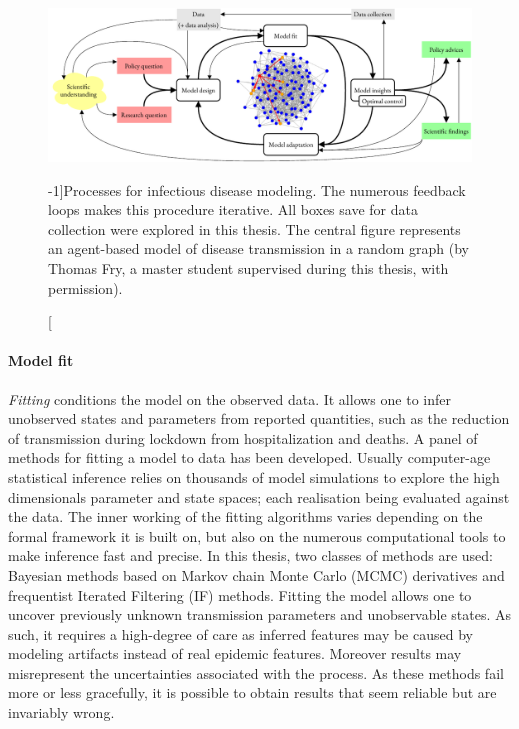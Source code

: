  \begin{figure}\centering
  \includegraphics{fig/modeling_cycle}
  \caption[Processes for infectious disease modeling][-1\baselineskip]{Processes for  infectious disease modeling. The numerous feedback loops makes this procedure iterative. All boxes save for data collection were explored in this thesis. The central figure represents an agent-based model of disease transmission in a random graph (by Thomas Fry, a master student supervised during this thesis, with permission).}\label{fig:modeling}
\end{figure}
\paragraph{Model fit} \textit{Fitting} conditions the model on the observed data. It allows one to infer unobserved states and parameters from reported quantities, such as the reduction of transmission during lockdown from hospitalization and deaths. A panel of methods for fitting a model to data has been developed. Usually computer-age statistical inference relies on thousands of model simulations to explore the high dimensionals parameter and state spaces; each realisation being evaluated against the data. The inner working of the fitting algorithms varies depending on the formal framework it is built on, but also on the numerous computational tools to make inference fast and precise. In this thesis, two classes of methods are used: Bayesian methods based on Markov chain Monte Carlo (MCMC) derivatives and frequentist Iterated Filtering (IF) methods. Fitting the model allows one to uncover previously unknown transmission parameters and unobservable states. As such, it requires a high-degree of care as inferred features may be caused by modeling artifacts instead of real epidemic features. Moreover results may misrepresent the uncertainties associated with the process. As these methods fail more or less gracefully, it is possible to obtain results that seem reliable but are invariably wrong.
 
